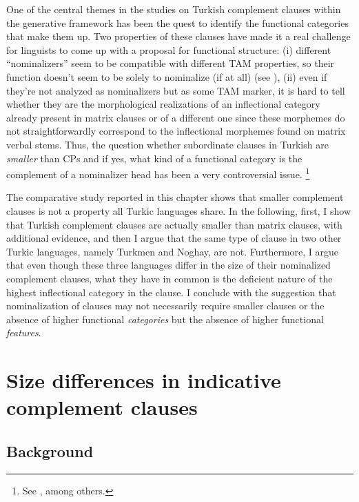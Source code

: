 \documentclass[output=paper]{langsci/langscibook}
\begin{document}
One of the central themes in the studies on Turkish complement clauses within the generative framework has been the quest 
to identify the functional categories that make them up. 
Two properties of these clauses have made it a real challenge for linguists to come up with a proposal for functional structure: 
(i) different ``nominalizers'' seem to be compatible with different TAM properties, 
so their function doesn't seem to be solely to nominalize (if at all) (see \citealt{Kelepir2015}), 
(ii) even if they're not analyzed as nominalizers but as some TAM marker, it is hard to tell whether they are 
the morphological realizations of an inflectional category already present in matrix clauses 
or of a different one since these morphemes do not straightforwardly correspond to the inflectional morphemes found on matrix verbal stems. 
Thus, the question whether subordinate clauses in Turkish are \textit{smaller} than CPs 
and if yes, what kind of a functional category is the complement of a nominalizer head has been a very controversial issue.%
\footnote{See \citealt{Kural1993,Kural1994,Kural1998,Kennelly1996,Goksel1997,Aygen2002,Kornfilt2007}, among others.} 

The comparative study reported in this chapter shows that smaller complement clauses is not a property all Turkic languages share. 
In the following, first, I show that Turkish complement clauses are actually smaller than matrix clauses, with additional evidence, 
and then I argue that the same type of clause in two other Turkic languages, namely Turkmen and Noghay, are not. 
Furthermore, I argue that even though these three languages differ in the size of their nominalized complement clauses, 
what they have in common is the deficient nature of the highest inflectional category in the clause. 
I conclude with the suggestion that nominalization of clauses may not necessarily require smaller clauses 
or the absence of higher functional \textit{categories} but the absence of higher functional \textit{features}.

\section{Size differences in indicative complement clauses} 
\label{kelepirsec:key:2}

\subsection{Background} 
\label{kelepirsec:key:2.1}
\end{document}
